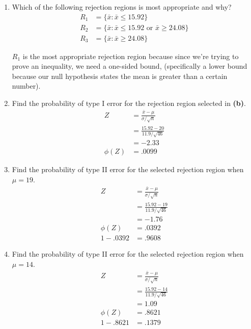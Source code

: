 \documentclass[12pt, letter]{article}
\begin{document}
\begin{enumerate}
\begin{enumerate}
		\item Which of the following rejection regions is most appropriate and why?
		\begin{align*}
			R_{1} &= \{\bar{x}:\bar{x} \le 15.92\} \\
			R_{2} &= \{\bar{x}:\bar{x} \le 15.92 \text{ or } \bar{x} \ge 24.08\} \\
			R_{3} &= \{\bar{x}:\bar{x} \ge 24.08\}
		\end{align*}
		\begin{center}
			$\boxed{R_{1}}$ is the most appropriate rejection region because since we're trying to prove an inequality, we need a one-sided bound, (specifically a lower bound because our null hypothesis states the mean is greater than a certain number).
		\end{center}
		
		\item Find the probability of type I error for the rejection region selected in \textbf{(b)}.
		\begin{align*}
			Z &= \frac{\bar{x} - \mu}{\sigma/\sqrt{n}} \\
			&= \frac{15.92 - 20}{11.9/\sqrt{46}} \\
			&= -2.33 \\
			\phi(Z) &= \boxed{.0099}
		\end{align*}
		
		\item Find the probability of type II error for the selected rejection region when $\mu = 19$.
		\begin{align*}
			Z &= \frac{\bar{x} - \mu}{\sigma/\sqrt{n}} \\
			&= \frac{15.92 - 19}{11.9/\sqrt{46}} \\
			&= -1.76 \\
			\phi (Z) &= .0392 \\
			1 - .0392 &= \boxed{.9608}
		\end{align*}
		
		\item Find the probability of type II error for the selected rejection region when $\mu = 14$.
		\begin{align*}
			Z &= \frac{\bar{x} - \mu}{\sigma/\sqrt{n}} \\
			&= \frac{15.92 - 14}{11.9/\sqrt{46}} \\
			&= 1.09 \\
			\phi (Z) &= .8621 \\
			1 - .8621 &= \boxed{.1379}
		\end{align*}
	\end{enumerate}
\end{enumerate}
\end{document}
